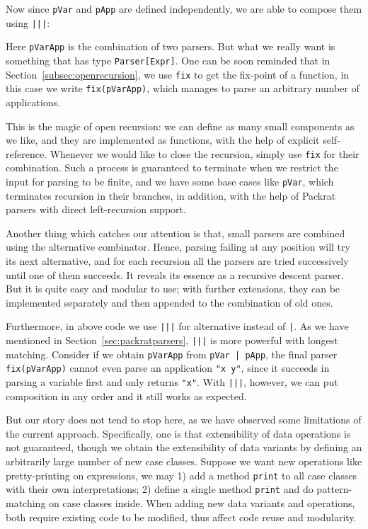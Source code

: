 
Now since \lstinline{pVar} and \lstinline{pApp} are defined independently, we are able to compose them using \lstinline{|||}:


Here \lstinline{pVarApp} is the combination of two parsers. But what we really want is something that has type \lstinline{Parser[Expr]}. One can be soon reminded that in Section~\ref{subsec:openrecursion}, we use \lstinline{fix} to get the fix-point of a function, in this case we write \lstinline{fix(pVarApp)}, which manages to parse an arbitrary number of applications.

This is the magic of open recursion: we can define as many small components as we like, and they are implemented as functions, with the help of explicit self-reference. Whenever we would like to close the recursion, simply use \lstinline{fix} for their combination. Such a process is guaranteed to terminate when we restrict the input for parsing to be finite, and we have some base cases like \lstinline{pVar}, which terminates recursion in their branches, in addition, with the help of Packrat parsers with direct left-recursion support.

Another thing which catches our attention is that, small parsers are combined using the alternative combinator. Hence, parsing failing at any position will try its next alternative, and for each recursion all the parsers are tried successively until one of them succeeds. It reveals its essence as a recursive descent parser. But it is quite easy and modular to use; with further extensions, they can be implemented separately and then appended to the combination of old ones.

Furthermore, in above code we use \lstinline{|||} for alternative instead of \lstinline{|}. As we have mentioned in Section~\ref{sec:packratparsers}, \lstinline{|||} is more powerful with longest matching. Consider if we obtain \lstinline{pVarApp} from \lstinline{pVar | pApp}, the final parser \lstinline{fix(pVarApp)} cannot even parse an application \lstinline{"x y"}, since it succeeds in parsing a variable first and only returns \lstinline{"x"}. With \lstinline{|||}, however, we can put composition in any order and it still works as expected.

But our story does not tend to stop here, as we have observed some limitations of the current approach. Specifically, one is that extensibility of data operations is not guaranteed, though we obtain the extensibility of data variants by defining an arbitrarily large number of new case classes. Suppose we want new operations like pretty-printing on expressions, we may 1) add a method \lstinline{print} to all case classes with their own interpretations; 2) define a single method \lstinline{print} and do pattern-matching on case classes inside. When adding new data variants and operations, both require existing code to be modified, thus affect code reuse and modularity.

